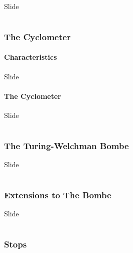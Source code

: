 \documentclass[hyphens,aspectratio=169]{beamer}
\begin{document}
\begin{frame}[fragile]{Slide}
\end{frame}

\part{}
\section{The Cyclometer}

\subsection{Characteristics}
\begin{frame}[fragile]{Slide}
\end{frame}

\subsection{The Cyclometer}
\begin{frame}[fragile]{Slide}
\end{frame}

\part{}
\section{The Turing-Welchman Bombe}

\begin{frame}[fragile]{Slide}
\end{frame}

\part{}
\section{Extensions to The Bombe}

\begin{frame}[fragile]{Slide}
\end{frame}

\part{}
\section{Stops}
\end{document}
